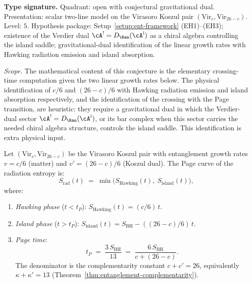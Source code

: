 \begin{conjecture}
\label{conj:ent-page-curve}
\textbf{Type signature.}  Quadrant: open with conjectural gravitational
dual.  Presentation: scalar two-line model on the Virasoro Koszul
pair $(\mathrm{Vir}_c,\mathrm{Vir}_{26-c})$.  Level: $5$.  Hypothesis
package: Setup~\ref{setup:ent-framework} (EH1)--(EH3); existence of
the Verdier dual $\cA^!=D_{\Ran}(\cA^{\mathrm i})$ as a chiral algebra
controlling the island saddle; gravitational-dual identification of
the linear growth rates with Hawking radiation emission and island
absorption.

\emph{Scope.} The mathematical content of this conjecture is the
elementary crossing-time computation given the two linear
growth rates below. The physical identification of $c/6$ and
$(26-c)/6$ with Hawking radiation emission and island absorption
respectively, and the identification of the crossing with the
Page transition, are heuristic:
they require a gravitational dual in which the Verdier-dual sector
$\cA^!=D_{\Ran}(\cA^{\mathrm i})$, or its bar complex when this sector
carries the needed chiral algebra structure, controls the island
saddle. This identification is extra physical input.

\smallskip
Let $(\mathrm{Vir}_c, \mathrm{Vir}_{26-c})$ be the Virasoro
Koszul pair with entanglement growth rates
$v = c/6$ \textup{(}matter\textup{)} and
$v' = (26-c)/6$ \textup{(}Koszul dual\textup{)}.
The Page curve of the radiation entropy is:
\begin{equation}\label{eq:ent-page-curve}
S_{\mathrm{rad}}(t)
\;=\;
\min\!\bigl(
 S_{\mathrm{Hawking}}(t),\;
 S_{\mathrm{island}}(t)
\bigr),
\end{equation}
where:
\begin{enumerate}[label=\textup{(\roman*)}]
\item \emph{Hawking phase} ($t < t_P$):
 $S_{\mathrm{Hawking}}(t) = (c/6)\,t$.

\item \emph{Island phase} ($t > t_P$):
 $S_{\mathrm{island}}(t)
 = S_{\mathrm{BH}} - ((26-c)/6)\,t$.

\item \emph{Page time}:
 \begin{equation}\label{eq:ent-page-time}
 t_P \;=\; \frac{3\,S_{\mathrm{BH}}}{13}
 \;=\;
 \frac{6\,S_{\mathrm{BH}}}{c + (26-c)}.
 \end{equation}
 The denominator is the complementarity constant
 $c + c' = 26$, equivalently $\kappa + \kappa' = 13$
 \textup{(}Theorem~\textup{\ref{thm:entanglement-complementarity}}\textup{)}.
\end{enumerate}
\end{conjecture}

